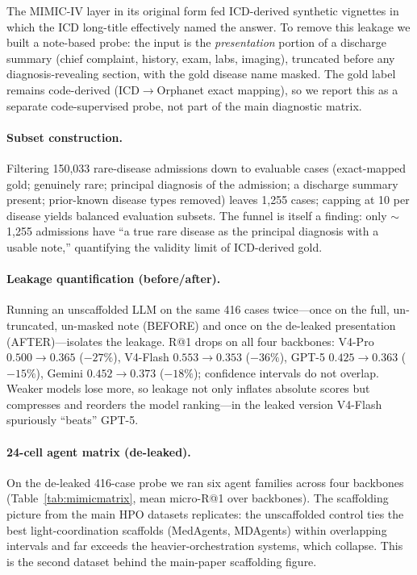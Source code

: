 \documentclass[letterpaper]{article} %
\begin{document}
The MIMIC-IV layer in its original form fed ICD-derived synthetic vignettes in
which the ICD long-title effectively named the answer. To remove this leakage we
built a note-based probe: the input is the \emph{presentation} portion of a
discharge summary (chief complaint, history, exam, labs, imaging), truncated
before any diagnosis-revealing section, with the gold disease name masked. The
gold label remains code-derived (ICD$\rightarrow$Orphanet exact mapping), so we
report this as a separate code-supervised probe, not part of the main
diagnostic matrix.

\paragraph{Subset construction.}
Filtering 150,033 rare-disease admissions down to evaluable cases
(exact-mapped gold; genuinely rare; principal diagnosis of the admission; a
discharge summary present; prior-known disease types removed) leaves 1,255
cases; capping at 10 per disease yields balanced evaluation subsets. The funnel
is itself a finding: only $\sim$1,255 admissions have ``a true rare disease as
the principal diagnosis with a usable note,'' quantifying the validity limit of
ICD-derived gold.

\paragraph{Leakage quantification (before/after).}
Running an unscaffolded LLM on the same 416 cases twice---once on the full,
un-truncated, un-masked note (BEFORE) and once on the de-leaked presentation
(AFTER)---isolates the leakage. R@1 drops on all four backbones:
V4-Pro $0.500\!\rightarrow\!0.365$ ($-27\%$), V4-Flash
$0.553\!\rightarrow\!0.353$ ($-36\%$), GPT-5 $0.425\!\rightarrow\!0.363$
($-15\%$), Gemini $0.452\!\rightarrow\!0.373$ ($-18\%$); confidence intervals do
not overlap. Weaker models lose more, so leakage not only inflates absolute
scores but compresses and reorders the model ranking---in the leaked version
V4-Flash spuriously ``beats'' GPT-5.

\paragraph{24-cell agent matrix (de-leaked).}
On the de-leaked 416-case probe we ran six agent families across four backbones
(Table~\ref{tab:mimicmatrix}, mean micro-R@1 over backbones). The scaffolding
picture from the main HPO datasets replicates: the unscaffolded control ties the
best light-coordination scaffolds (MedAgents, MDAgents) within overlapping
intervals and far exceeds the heavier-orchestration systems, which collapse.
This is the second dataset behind the main-paper scaffolding figure.
\end{document}

